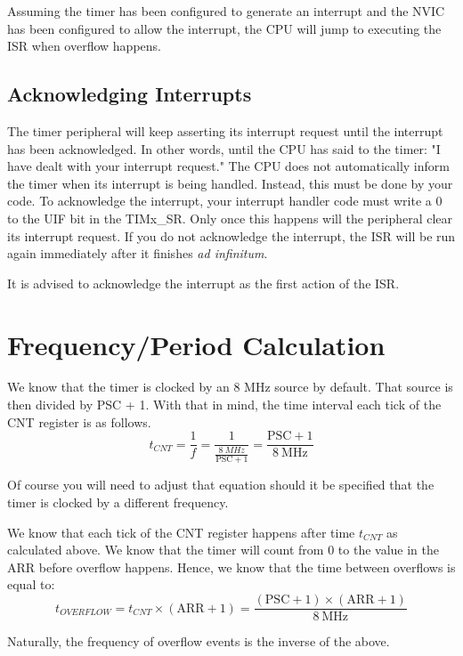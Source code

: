 Assuming the timer has been configured to generate an interrupt and the NVIC has been configured to allow the interrupt, the CPU will jump to executing the ISR when overflow happens.

\subsection{Acknowledging Interrupts} 
The timer peripheral will keep asserting its interrupt request until the interrupt has been acknowledged. 
In other words, until the CPU has said to the timer: "I have dealt with your interrupt request." 
The CPU does not automatically inform the timer when its interrupt is being handled.
Instead, this must be done by your code.
To acknowledge the interrupt, your interrupt handler code must write a 0 to the UIF bit in the TIMx\_SR.
Only once this happens will the peripheral clear its interrupt request.
If you do not acknowledge the interrupt, the ISR will be run again immediately after it finishes \emph{ad infinitum}. 

It is advised to acknowledge the interrupt as the first action of the ISR.

\section{Frequency/Period Calculation}
We know that the timer is clocked by an 8 MHz source by default. That source is then divided by PSC + 1. With that in mind, the time interval each tick of the CNT register is as follows.
\begin{equation}
    t_{CNT} = \frac{1}{f} = \frac{1}{\frac{\SI{8}{MHz}}{\text{PSC} + 1}} = \frac{\text{PSC} + 1}{\SI{8}{\mega\hertz}}
\end{equation}

Of course you will need to adjust that equation should it be specified that the timer is clocked by a different frequency.

We know that each tick of the CNT register happens after time $t_{CNT}$ as calculated above. We know that the timer will count from 0 to the value in the ARR before overflow happens. 
Hence, we know that the time between overflows is equal to:
\begin{equation}
  t_{OVERFLOW} = t_{CNT} \times (\text{ARR} + 1) = \frac{(\text{PSC} + 1) \times (\text{ARR} + 1)}{\SI{8}{\mega\hertz}}
\end{equation}

Naturally, the frequency of overflow events is the inverse of the above.
